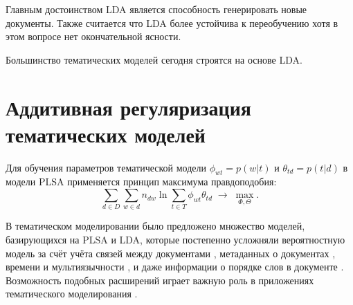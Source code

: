 

Главным достоинством LDA является способность генерировать новые документы. Также считается что LDA более устойчива к переобучению хотя в этом вопросе нет окончательной ясности.

Большинство тематических моделей сегодня строятся на основе LDA.

\section{Аддитивная регуляризация тематических моделей}

Для обучения параметров тематической модели $\phi_{wt}=p(w|t)$ и $\theta_{td}=p(t|d)$ в модели PLSA применяется принцип максимума  правдоподобия:
\begin{equation}
\label{eq:logL}
    \sum_{d\in D} \sum_{w\in d} n_{dw} \ln
        \sum_{t\in T}
            \phi_{wt}\theta_{td}
    \;\to\; \max_{\Phi,\Theta}.
\end{equation}

В тематическом моделировании было предложено множество моделей, базирующихся на PLSA и LDA, которые постепенно усложняли вероятностную модель за счёт учёта связей между документами \cite{cohn2001missing,mccallum2005author,nallapati2008link}, метаданных о документах \cite{steyvers2004probabilistic}, 
времени и мультиязычности \cite{zosa-granroth-wilding-2019-multilingual}, и даже информации о порядке слов в документе \cite{gruber2007hidden,wallach2006topic}. Возможность подобных расширений играет важную роль в приложениях тематического моделирования \cite{fntir2017applications}.

